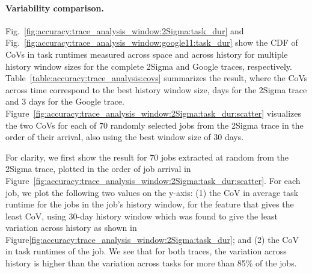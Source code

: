 \paragraph{Variability comparison.}
{
Fig.~\ref{fig:accuracy:trace_analysis_window:2Sigma:task_dur} and
Fig.~\ref{fig:accuracy:trace_analysis_window:google11:task_dur} show the CDF of CoVs
in task runtimes measured across space and across history for multiple history
window sizes for the complete 2Sigma and Google traces, respectively.
Table~\ref{table:accuracy:trace_analysis:covs} summarizes the result,
where the CoVs across time correspond to the best history window size,
 days for the 2Sigma trace and 3 days for
the Google trace.
}
Figure~\ref{fig:accuracy:trace_analysis_window:2Sigma:task_dur:scatter}
visualizes the two CoVs for each of 70 randomly selected jobs from the 2Sigma trace in the order of
their arrival, also using the best window size of 30 days.

\rm{For clarity, we first show the result for 70 jobs extracted at
random from the 2Sigma trace, plotted in the order of job arrival in
Figure~\ref{fig:accuracy:trace_analysis_window:2Sigma:task_dur:scatter}.
For each job, we plot the following two values on the y-axis:
%
(1) the CoV in average task runtime for the jobs
in the job's history window, for the feature that gives the least CoV,
using 30-day history window which was found to give the least
variation across history as shown in
Figure\ref{fig:accuracy:trace_analysis_window:2Sigma:task_dur}; and
(2) the CoV in task runtimes of the job.  We see that for both traces, the
variation across history is higher than the variation across tasks for more
than 85\% of the jobs.
}

